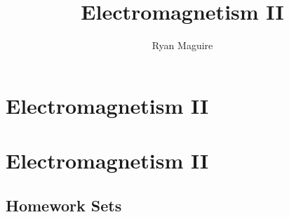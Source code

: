 \documentclass[crop=false,class=book,oneside]{standalone}
\begin{document}
    \ifx\ifphysicscourses\undefined
        \title{Electromagnetism II}
        \author{Ryan Maguire}
        \date{\vspace{-5ex}}
        \maketitle
        \tableofcontents
        \listoffigures
        \clearpage
        \setcounter{chapter}{28}
        \chapter{Electromagnetism II}
    \else
        \chapter{Electromagnetism II}
    \fi
    \section{Homework Sets}
\end{document}
